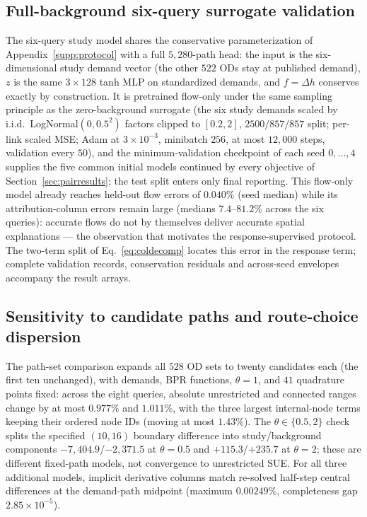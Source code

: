 \subsection{Full-background six-query surrogate validation}\label{supp:fullbgsurrogate}
The six-query study model shares the conservative parameterization of
Appendix~\ref{supp:protocol} with a full $5{,}280$-path head: the input
is the six-dimensional study demand vector (the other $522$ ODs stay
at published demand), $z$ is the same $3\times128$ tanh MLP on
standardized demands, and $f=\Delta h$ conserves exactly by
construction. It is pretrained flow-only under the same sampling
principle as the zero-background surrogate (the six study demands
scaled by i.i.d.\ LogNormal$(0,0.5^2)$ factors clipped to $[0.2,2]$,
$2500/857/857$ split; per-link scaled MSE; Adam at $3\times10^{-3}$,
minibatch $256$, at most $12{,}000$ steps, validation every $50$), and
the minimum-validation checkpoint of each seed $0,\ldots,4$ supplies
the five common initial models continued by every objective of
Section~\ref{sec:pairresults}; the test split enters only final
reporting. This flow-only model already reaches held-out flow errors
of $0.040\%$ (seed median) while its attribution-column errors remain
large (medians $7.4$--$81.2\%$ across the six queries): accurate flows
do not by themselves deliver accurate spatial explanations --- the
observation that motivates the response-supervised protocol. The
two-term split of Eq.~\eqref{eq:coldecomp} locates this error in the
response term; complete validation records, conservation residuals and
across-seed envelopes accompany the result arrays.

\subsection{Sensitivity to candidate paths and route-choice dispersion}\label{supp:coverage}
The path-set comparison expands all $528$ OD sets to twenty
candidates each (the first ten unchanged), with demands, BPR
functions, $\theta=1$, and $41$ quadrature points fixed: across the
eight queries, absolute unrestricted and connected ranges change by
at most $0.977\%$ and $1.011\%$, with the three largest
internal-node terms keeping their ordered node IDs (moving at most
$1.43\%$). The $\theta\in\{0.5,2\}$ check splits the specified
$(10,16)$ boundary difference into study/background components
$-7{,}404.9$/$-2{,}371.5$ at $\theta=0.5$ and $+115.3$/$+235.7$ at
$\theta=2$; these are different fixed-path models, not convergence to
unrestricted SUE. For all three additional models, implicit derivative
columns match re-solved half-step central differences at the
demand-path midpoint (maximum $0.00249\%$, completeness gap
$2.85\times10^{-5}$).

